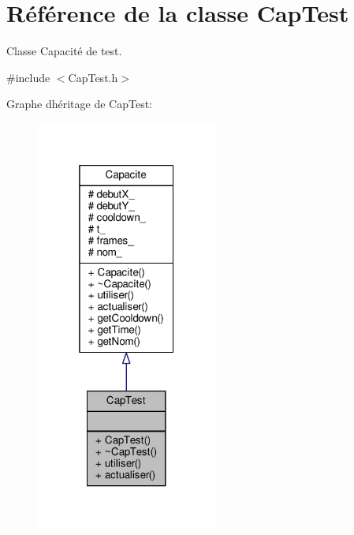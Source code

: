 \hypertarget{class_cap_test}{}\section{Référence de la classe Cap\+Test}
\label{class_cap_test}


Classe Capacité de test.  




{\ttfamily \#include $<$Cap\+Test.\+h$>$}



Graphe d\textquotesingle{}héritage de Cap\+Test\+:\nopagebreak
\begin{figure}[H]
\begin{center}
\leavevmode
\includegraphics[width=169pt]{class_cap_test__inherit__graph}
\end{center}
\end{figure}


